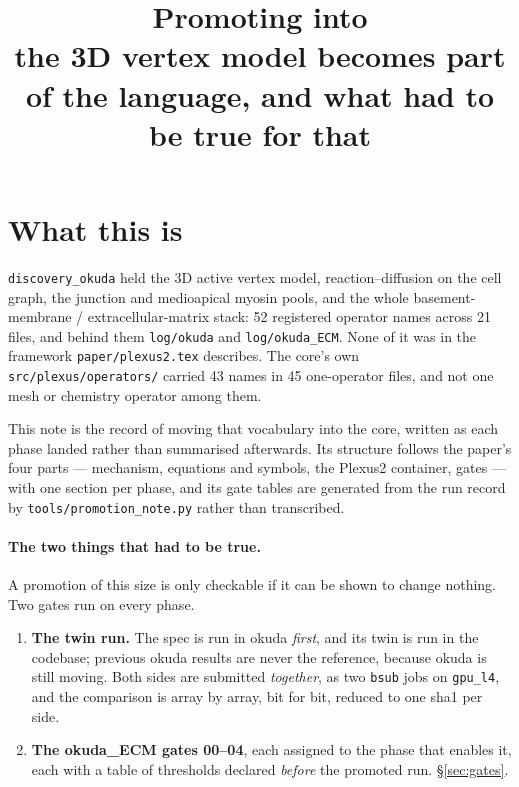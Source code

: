 \documentclass[11pt,a4paper]{article}
\title{\vspace{-1.6cm}\textbf{Promoting \code{discovery\_okuda} into \code{src/plexus}}\\[2pt]
\large the 3D vertex model becomes part of the language, and what had to be true for that}
\author{}
\date{}
\newcommand{\code}[1]{\texttt{\small #1}}
\begin{document}
\maketitle
\vspace{-1.1cm}

\section{What this is}

\code{discovery\_okuda} held the 3D active vertex model, reaction--diffusion on the cell graph, the
junction and medioapical myosin pools, and the whole basement-membrane / extracellular-matrix stack:
52 registered operator names across 21 files, and behind them \code{log/okuda} and
\code{log/okuda\_ECM}. None of it was in the framework \code{paper/plexus2.tex} describes. The core's
own \code{src/plexus/operators/} carried 43 names in 45 one-operator files, and not one mesh or
chemistry operator among them.

This note is the record of moving that vocabulary into the core, written as each phase landed rather
than summarised afterwards. Its structure follows the paper's four parts --- mechanism, equations and
symbols, the Plexus2 container, gates --- with one section per phase, and its gate tables are
generated from the run record by \code{tools/promotion\_note.py} rather than transcribed.

\paragraph{The two things that had to be true.} A promotion of this size is only checkable if it can
be shown to change nothing. Two gates run on every phase.

\begin{enumerate}
\item \textbf{The twin run.} The spec is run in okuda \emph{first}, and its twin is run in the
  codebase; previous okuda results are never the reference, because okuda is still moving. Both
  sides are submitted \emph{together}, as two \code{bsub} jobs on \code{gpu\_l4}, and the comparison
  is array by array, bit for bit, reduced to one sha1 per side.
\item \textbf{The okuda\_ECM gates 00--04}, each assigned to the phase that enables it, each with a
  table of thresholds declared \emph{before} the promoted run. \S\ref{sec:gates}.
\end{enumerate}
\end{document}

